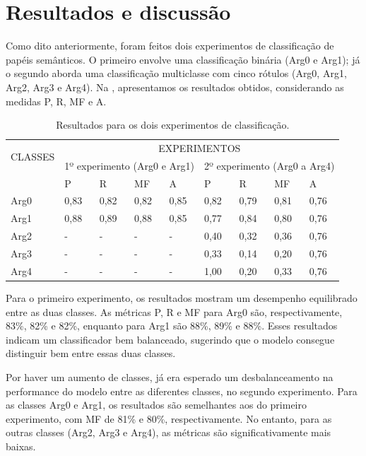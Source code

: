 \section{Resultados e discussão}\label{sec-resultados}

Como dito anteriormente, foram feitos dois experimentos de classificação
de papéis semânticos. O primeiro envolve uma classificação binária (Arg0
e Arg1); já o segundo aborda uma classificação multiclasse com cinco
rótulos (Arg0, Arg1, Arg2, Arg3 e Arg4). Na , apresentamos os
resultados obtidos, considerando as medidas P, R, MF e A.

\begin{table}[htbp]
  \centering 
  \begin{threeparttable}
  \caption{Resultados para os dois experimentos de classificação.}
  \label{tab-03}
  \begin{tabular}{*{9}{l}}
  \toprule
  \multirow{2}{*}{CLASSES} & \multicolumn{8}{c}{EXPERIMENTOS} \\
    & \multicolumn{4}{c}{1º experimento (Arg0 e Arg1)} & \multicolumn{4}{c}{2º experimento (Arg0 a Arg4)} \\
    & P & R & MF & A & P & R & MF & A \\
  Arg0 & 0,83 & 0,82 & 0,82 & 0,85 & 0,82 & 0,79 & 0,81 & 0,76 \\
  Arg1 & 0,88 & 0,89 & 0,88 & 0,85 & 0,77 & 0,84 & 0,80 & 0,76 \\
  Arg2 &  -   &   -  &   -  &  -   & 0,40 & 0,32 & 0,36 & 0,76 \\
  Arg3 &  -   &   -  &   -  &  -   & 0,33 & 0,14 & 0,20 & 0,76 \\
  Arg4 &  -   &   -  &   -  &  -   & 1,00 & 0,20 & 0,33 & 0,76 \\
  \bottomrule
  \end{tabular}
  \end{threeparttable}
\end{table}

Para o primeiro experimento, os resultados mostram um desempenho
equilibrado entre as duas classes. As métricas P, R e MF para Arg0 são,
respectivamente, 83\%, 82\% e 82\%, enquanto para Arg1 são 88\%, 89\% e
88\%. Esses resultados indicam um classificador bem balanceado,
sugerindo que o modelo consegue distinguir bem entre essas duas classes.

Por haver um aumento de classes, já era esperado um desbalanceamento na
performance do modelo entre as diferentes classes, no segundo
experimento. Para as classes Arg0 e Arg1, os resultados são semelhantes
aos do primeiro experimento, com MF de 81\% e 80\%, respectivamente. No
entanto, para as outras classes (Arg2, Arg3 e Arg4), as métricas são
significativamente mais baixas.

